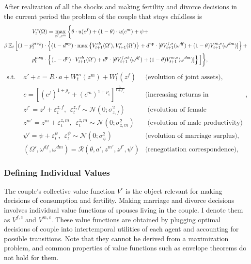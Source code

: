 After realization of all the shocks and making fertility and divorce decisions in the current period the problem of the couple that stays childless is
\begin{align}& \hspace{5em}  V^{c}_t(\Omega) = \max\limits_{c^f,c^m}  \bigg\{ \theta\cdot u(c^f) + (1-\theta)\cdot u(c^m) + \psi +  \label{vf-c} \\   \nonumber
 &  \beta \operatorname{\mathbb{E}}_t \Big[   (1 - p^{\text{preg}}_t)\cdot \left\{ (1-d^{\text{np}})\cdot \max\left\{ V^{ck}_{t+1}(\Omega'),V^{c}_{t+1}(\Omega')\right\} + d^{\text{np}}\cdot [ \theta V_{t+1}^{f,s}(\omega^{df}) + (1-\theta)V_{t+1}^{m,s}(\omega^{dm})]\right\}  +  \\  \nonumber
& \hspace{5em} p^{\text{preg}}_t\cdot \left\{ (1-d^{\text{p}})\cdot V^{ck}_{t+1}(\Omega') + d^{\text{p}}\cdot [ \theta V_{t+1}^{f,sk}(\omega^{df}) + (1-\theta)V_{t+1}^{m,s}(\omega^{dm})]\right\} \Big] \bigg\},
\end{align}\vspace{-2em}
\begin{align*}
\text{s.t. \ }& a' + c = R\cdot a  + W^m_t(z^m) + W^f_t(z^f) & \text{(evolution of joint assets)},\\
				 & c = [(c^f)^{1+\rho_c} + (c^m)^{1+\rho_c}]^{\frac1{1+\rho_c}} & \text{(increasing returns in consumption)},\\
				 &  z^{f\prime} = z^f + \varepsilon^{z,f}_t, \ \ \varepsilon^{z,f}_t \sim \mathcal{N}(0;\sigma_{z,f}^2) &  \text{ (evolution of female productivity)}\\
				 &  z^{m\prime} = z^m + \varepsilon^{z,m}_t, \ \ \varepsilon^{z,m}_t \sim \mathcal{N}(0;\sigma_{z,m}^2) &  \text{ (evolution of male productivity)}\\
                    & \psi' = \psi + \varepsilon^{\psi}_t, \ \ \varepsilon^{\psi}_t \sim \mathcal{N}(0;\sigma_{\psi}^2)  & \text{(evolution of marriage surplus),} \\
                    & (\Omega',\omega^{df},\omega^{dm}) = \mathcal{R}(\theta,a',z^{m\prime},z^{f\prime},\psi') & \text{(renegotiation correspondence)},
\end{align*}

\subsubsection{Defining Individual Values}
The couple's collective value function $V^c$ is the object relevant for making decisions of consumption and fertility. Making marriage and divorce decisions involves individual value functions of spouses living in the couple. I denote them as $V^{f,c}$ and $V^{m,c}$. These value functions are obtained by plugging optimal decisions of couple into intertemporal utilities of each agent and accounting for possible transitions. Note that they cannot be derived from a maximization problem, and common properties of value functions such as envelope theorems do not hold for them.

